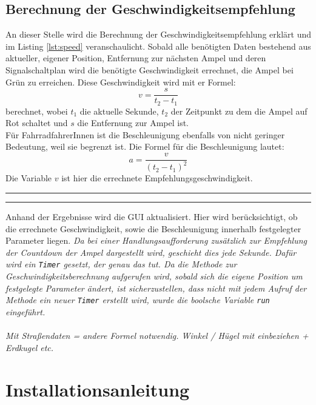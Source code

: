 \subsection{Berechnung der Geschwindigkeitsempfehlung}
An dieser Stelle wird die Berechnung der Geschwindigkeitsempfehlung erklärt und im Listing \ref{lst:speed} veranschaulicht.
Sobald alle benötigten Daten bestehend aus aktueller, eigener Position, Entfernung zur nächsten Ampel und deren Signalschaltplan wird die benötigte Geschwindigkeit errechnet, die Ampel bei Grün zu erreichen. Diese Geschwindigkeit wird mit er Formel: 
\[ v = \frac{s}{t_{2} - t_{1}} \]
berechnet, wobei $t_1$ die aktuelle Sekunde, $t_2$ der Zeitpunkt zu dem die Ampel auf Rot schaltet und $s$ die Entfernung zur Ampel ist. \\
Für FahrradfahrerInnen ist die Beschleunigung ebenfalls von nicht geringer Bedeutung, weil sie begrenzt ist. Die Formel für die Beschleunigung lautet:
\[ a = \frac{v}{(t_{2} - t_{1})^{2}} \] 
Die Variable $v$ ist hier die errechnete Empfehlungsgeschwindigkeit.
\begin{center}
\rule{35em}{0.5pt}  \rule{35em}{0.5pt}
\end{center}
Anhand der Ergebnisse wird die \gls{GUI} aktualisiert. Hier wird berücksichtigt, ob die errechnete Geschwindigkeit, sowie die Beschleunigung innerhalb festgelegter Parameter liegen.
\textit{ Da bei einer Handlungsaufforderung zusätzlich zur Empfehlung der Countdown der Ampel dargestellt wird, geschieht dies jede Sekunde. Dafür wird ein \texttt{Timer} gesetzt, der genau das tut. Da die Methode zur Geschwindigkeitsberechnung aufgerufen wird, sobald sich die eigene Position um \textit{festgelegte Parameter} ändert, ist sicherzustellen, dass nicht mit jedem Aufruf der Methode ein neuer \texttt{Timer} erstellt wird, wurde die boolsche Variable \texttt{run} eingeführt. }\\\\
\textit{Mit Straßendaten = andere Formel notwendig. Winkel / Hügel mit einbeziehen + Erdkugel etc.}
%
%
\section{Installationsanleitung}


